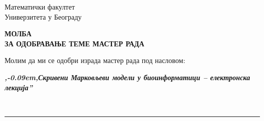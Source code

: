 \documentclass[a4paper]{article}
\def\zn{,\kern-0.09em,}
\begin{document}
\thispagestyle{empty}

\begin{flushleft}
Математички факултет\\
Универзитета у Београду
\end{flushleft}

\bigskip

\begin{center}
\textbf{МОЛБА\\
ЗА ОДОБРАВАЊЕ ТЕМЕ МАСТЕР РАДА
}\end{center}

\bigskip

\begin{flushleft}
Молим да ми се одобри израда мастер рада под насловом:
\end{flushleft}

\begin{minipage}{16.5cm}
\textbf{\textit{\zn Скривени Марковљеви модели у биоинформатици -- електронска лекција''}}
\end{minipage}\\
\rule[4mm]{17.5cm}{.05mm}
\end{document}
